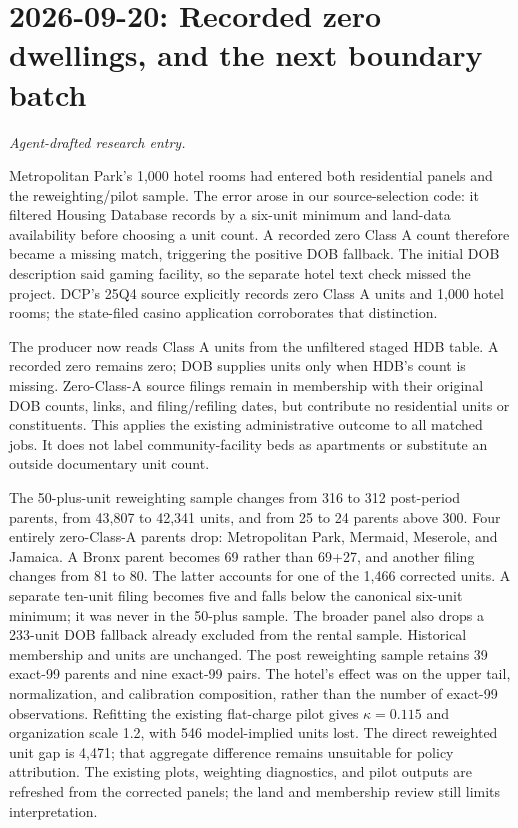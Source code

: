 \clearpage
\section*{2026-09-20: Recorded zero dwellings, and the next boundary batch}
\textit{Agent-drafted research entry.}

Metropolitan Park's 1,000 hotel rooms had entered both residential panels and
the reweighting/pilot sample. The error arose in our source-selection code:
it filtered Housing Database records by a six-unit minimum and land-data
availability before choosing a unit count. A recorded zero Class A count
therefore became a missing match, triggering the positive DOB fallback.
The initial DOB description said gaming facility, so the separate hotel text
check missed the project. DCP's 25Q4 source explicitly records zero Class A
units and 1,000 hotel rooms; the state-filed casino application corroborates
that distinction.

The producer now reads Class A units from the unfiltered staged HDB table.
A recorded zero remains zero; DOB supplies units only when HDB's count is
missing. Zero-Class-A source filings remain in membership with their original
DOB counts, links, and filing/refiling dates, but contribute no residential
units or constituents. This applies the existing administrative outcome to
all matched jobs. It does not label community-facility beds as apartments or
substitute an outside documentary unit count.

The 50-plus-unit reweighting sample changes from 316 to 312 post-period
parents, from 43,807 to 42,341 units, and from 25 to 24 parents above 300.
Four entirely zero-Class-A parents drop: Metropolitan Park, Mermaid,
Meserole, and Jamaica. A Bronx parent becomes 69 rather than 69+27, and
another filing changes from 81 to 80. The latter accounts for one of the
1,466 corrected units. A separate ten-unit filing becomes five and falls
below the canonical six-unit minimum; it was never in the 50-plus sample.
The broader panel also drops a 233-unit DOB fallback already excluded from
the rental sample. Historical membership and units are unchanged. The post
reweighting sample retains 39 exact-99 parents and nine exact-99 pairs.
The hotel's effect was on the upper tail, normalization, and calibration
composition, rather than the number of exact-99 observations. Refitting the
existing flat-charge pilot gives $\kappa=0.115$ and organization scale 1.2,
with 546 model-implied units lost. The direct reweighted unit gap is 4,471;
that aggregate difference remains unsuitable for policy attribution. The existing
plots, weighting diagnostics, and pilot outputs are refreshed from the
corrected panels; the land and membership review still limits interpretation.


